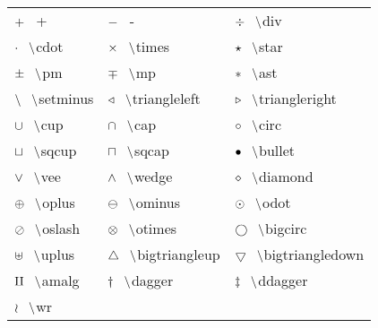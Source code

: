 \documentclass{ctexart}
\newcommand{\pair}[2]{${#1} \hspace{0.3cm} \backslash ${#2}}
\newcommand{\nbpair}[2]{${#1} \hspace{0.3cm} ${#2}} %
\begin{document}
\begin{tabular}{p{4.4cm}p{4.4cm}p{4.4cm}}
    \nbpair{+}{+}              & \nbpair{-}{-}                        & \pair{\div}{div}                         \\
    \pair{\cdot}{cdot}         & \pair{\times}{times}                 & \pair{\star}{star}                       \\
    \pair{\pm}{pm}             & \pair{\mp}{mp}                       & \pair{\ast}{ast}                         \\
    \pair{\setminus}{setminus} & \pair{\triangleleft}{triangleleft}   & \pair{\triangleright}{triangleright}     \\
    \pair{\cup}{cup}           & \pair{\cap}{cap}                     & \pair{\circ}{circ}                       \\
    \pair{\sqcup}{sqcup}       & \pair{\sqcap}{sqcap}                 & \pair{\bullet}{bullet}                   \\
    \pair{\vee}{vee}           & \pair{\wedge}{wedge}                 & \pair{\diamond}{diamond}                 \\
    \pair{\oplus}{oplus}       & \pair{\ominus}{ominus}               & \pair{\odot}{odot}                       \\
    \pair{\oslash}{oslash}     & \pair{\otimes}{otimes}               & \pair{\bigcirc}{bigcirc}                 \\
    \pair{\uplus}{uplus}       & \pair{\bigtriangleup}{bigtriangleup} & \pair{\bigtriangledown}{bigtriangledown} \\
    \pair{\amalg}{amalg}       & \pair{\dagger}{dagger}               & \pair{\ddagger}{ddagger}                 \\
    \pair{\wr}{wr}             &                                      &                                          \\
\end{tabular}
\end{document}
